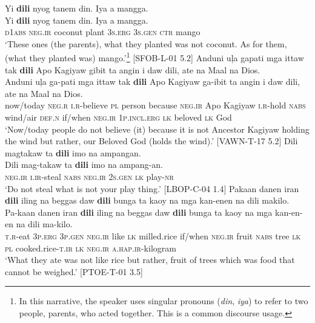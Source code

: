 \ea
Yi  \textbf{dili}  nyog  tanem  din.  Iya  a  mangga. \\\smallskip
\gll Yi  \textbf{dili}  nyog  tanem  din.  Iya  a  mangga. \\
\textsc{d1abs}  \textsc{neg.ir}  coconut  plant  3\textsc{s.erg}  3\textsc{s.gen}  \textsc{ctr}  mango \\
\glt ‘These ones (the parents), what they planted was not coconut. As for them, (what they planted was) mango.’\footnote{In this narrative, the speaker uses singular pronouns (\textit{din}, \textit{iya}) to refer to two people, parents, who acted together. This is a common discourse usage.} [SFOB-L-01 5.2]
\z
\ea
Anduni  uļa  gapati  mga  ittaw  tak  \textbf{dili}  Apo  Kagiyaw gibit  ta  angin  i daw  dili,  ate  na  Maal  na Dios. \\\smallskip
\gll Anduni  uļa  ga-pati  mga  ittaw  tak  \textbf{dili}  Apo  Kagiyaw ga-ibit  ta  angin  i daw  dili,\footnotemark{}  ate  na  Maal  na Dios. \\
now/today  \textsc{neg.r}  \textsc{i.r}-believe  \textsc{pl}  person  because  \textsc{neg.ir}  Apo  Kagiyaw
\textsc{i.r}-hold  \textsc{nabs}  wind/air  \textsc{def.n}
if/when  \textsc{neg.ir}  1\textsc{p.incl.erg}  \textsc{lk}  beloved  \textsc{lk} God \\
\glt `Now/today people do not believe (it) because it is not Ancestor Kagiyaw holding the wind but rather, our Beloved God (holds the wind).’ [VAWN-T-17 5.2]
\z
\ea
Dili  magtakaw  ta  \textbf{dili}  imo  na  ampangan. \\\smallskip
\gll Dili  mag-takaw  ta  \textbf{dili}  imo  na  ampang-an. \\
\textsc{neg.ir}  \textsc{i.ir}-steal  \textsc{nabs}  \textsc{neg.ir}  2\textsc{s.gen}  \textsc{lk}  play-\textsc{nr} \\
\glt ‘Do not steal what is not your play thing.’ [LBOP-C-04 1.4]
\z
\ea
Pakaan  danen  iran  \textbf{dili}  iling  na  beggas  daw  \textbf{dili} bunga  ta  kaoy  na  mga  kan-enen  na  dili  makilo. \\\smallskip
\gll Pa-kaan  danen  iran  \textbf{dili}  iling  na  beggas  daw  \textbf{dili} bunga  ta  kaoy  na  mga  kan-en-en  na  dili  ma-kilo. \\
\textsc{t.r}-eat  3\textsc{p.erg}  3\textsc{p.gen}  \textsc{neg.ir}  like  \textsc{lk}  milled.rice  if/when  \textsc{neg.ir}
fruit  \textsc{nabs}  tree  \textsc{lk}  \textsc{pl}  cooked.rice-\textsc{t.ir}  \textsc{lk}  \textsc{neg.ir}  \textsc{a.hap.ir}-kilogram \\
\glt `What they ate was not like rice but rather, fruit of trees which was food that cannot be weighed.’ [PTOE-T-01 3.5]
\z

